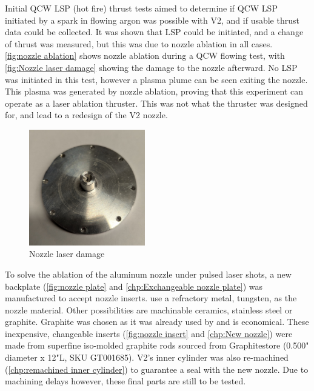 Initial QCW LSP (hot fire) thrust tests aimed to determine if QCW LSP initiated by a spark in flowing argon was possible with V2, and if usable thrust data could be collected. It was shown that LSP could be initiated, and a change of thrust was measured, but this was due to nozzle ablation in all cases. \autoref{fig:nozzle ablation} shows nozzle ablation during a QCW flowing test, with \autoref{fig:Nozzle laser damage} showing the damage to the nozzle afterward. No LSP was initiated in this test, however a plasma plume can be seen exiting the nozzle. This plasma was generated by nozzle ablation, proving that this experiment can operate as a laser ablation thruster. This was not what the thruster was designed for, and lead to a redesign of the V2 nozzle.
\begin{figure}[!ht]
    \centering
    \includegraphics[width=0.45\textwidth]{assets/4 experiments/Nozzle damage.jpg}
    \caption{Nozzle laser damage}
    \label{fig:Nozzle laser damage}
\end{figure}
To solve the ablation of the aluminum nozzle under pulsed laser shots, a new backplate (\autoref{fig:nozzle plate} and \autoref{chp:Exchangeable nozzle plate}) was manufactured to accept nozzle inserts. \textcite{toyodaThrustPerformanceCW2002} use a refractory metal, tungsten, as the nozzle material. Other possibilities are machinable ceramics, stainless steel or graphite. Graphite was chosen as it was already used by \textcite{shojiLaserheatedRocketThruster1977} and is economical. These inexpensive, changeable inserts (\autoref{fig:nozzle insert} and \autoref{chp:New nozzle}) were made from superfine iso-molded graphite rods sourced from Graphitestore (0.500" diameter x 12"L, SKU GT001685). V2's inner cylinder was also re-machined (\autoref{chp:remachined inner cylinder}) to guarantee a seal with the new nozzle. Due to machining delays however, these final parts are still to be tested.

